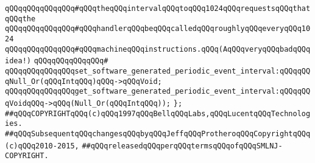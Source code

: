 \verb|qQQqqQQqqQQqqQQq#qQQqtheqQQqintervalqQQqtoqQQq1024qQQqrequestsqQQqthatqQQqthe|\newline
\verb|qQQqqQQqqQQqqQQq#qQQqhandlerqQQqbeqQQqcalledqQQqroughlyqQQqeveryqQQq1024|\newline
\verb|qQQqqQQqqQQqqQQq#qQQqmachineqQQqinstructions.qQQq(AqQQqveryqQQqbadqQQqidea!)|\newline
\verb|qQQqqQQqqQQqqQQq#|\newline
\verb|qQQqqQQqqQQqqQQqset_software_generated_periodic_event_interval:qQQqqQQqNull_Or(qQQqIntqQQq)qQQq->qQQqVoid;|\newline
\verb|qQQqqQQqqQQqqQQqget_software_generated_periodic_event_interval:qQQqqQQqVoidqQQq->qQQq(Null_Or(qQQqIntqQQq));|\newline
\verb|};|\newline
\newline
\newline
\newline
\verb|##qQQqCOPYRIGHTqQQq(c)qQQq1997qQQqBellqQQqLabs,qQQqLucentqQQqTechnologies.|\newline
\verb|##qQQqSubsequentqQQqchangesqQQqbyqQQqJeffqQQqProtheroqQQqCopyrightqQQq(c)qQQq2010-2015,|\newline
\verb|##qQQqreleasedqQQqperqQQqtermsqQQqofqQQqSMLNJ-COPYRIGHT.|\newline

